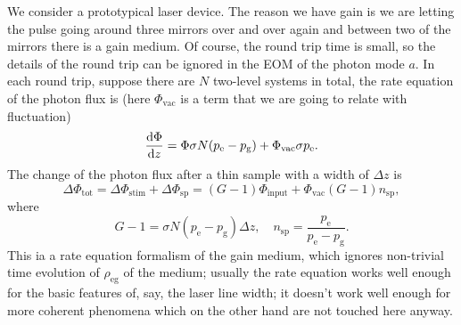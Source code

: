 \documentclass[hyperref, a4paper]{article}
\newcommand*{\pope}{p_{\text{e}}}
\newcommand*{\popg}{p_{\text{g}}}
\begin{document}
We consider a prototypical laser device.
The reason we have gain is we are letting the pulse going around three mirrors over and over again 
and between two of the mirrors there is a gain medium.
Of course, the round trip time is small, 
so the details of the round trip can be ignored in the EOM of the photon mode $a$.
In each round trip, suppose there are $N$ two-level systems in total,
the rate equation of the photon flux is 
(here $\Phi_{\text{vac}}$ is a term that we are going to relate with fluctuation)
\begin{equation}
    \dv{\Phi}{z} = \Phi \sigma N (\pope - \popg) + \Phi_{\text{vac}} \sigma \pope.
\end{equation}
The change of the photon flux after a thin sample with a width of $\Delta z$ is 
\begin{equation}
    \Delta \Phi_{\text{tot}} = \Delta \Phi_{\text{stim}} + \Delta \Phi_{\text{sp}}
    = (G - 1) \Phi_{\text{input}} + \Phi_{\text{vac}} (G  -1 ) n_{\text{sp}},
    \label{eq:thin-sample-phi-growth}
\end{equation}
where 
\begin{equation}
    G - 1 = \sigma N (\pope - \popg) \Delta z , \quad 
    n_{\text{sp}} = \frac{\pope}{\pope - \popg}.
\end{equation}
This ia a rate equation formalism of the gain medium,
which ignores non-trivial time evolution of $\rho_{\text{eg}}$ of the medium;
usually the rate equation works well enough for the basic features of, say, the laser line width;
it doesn't work well enough for more coherent phenomena which on the other hand are not touched here anyway. 
\end{document}
